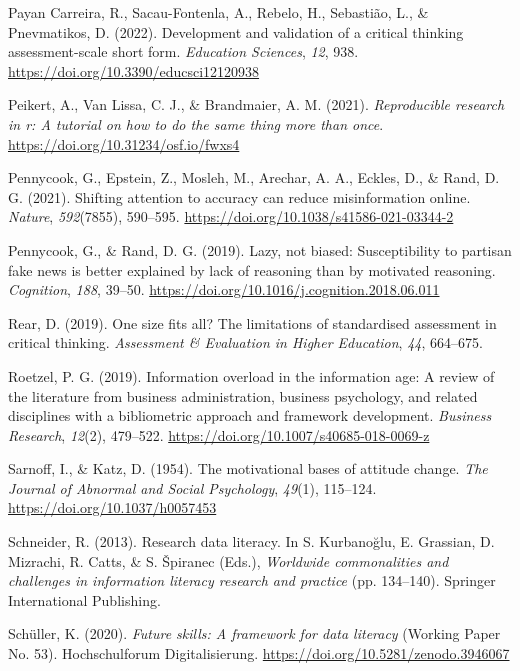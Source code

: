 \documentclass[
  12pt,
  a4paper,
  twoside]{article}
\newlength{\cslhangindent}
\newenvironment{CSLReferences}[2] %
 {\begin{list}{}{%
  \setlength{\itemindent}{0pt}
  \setlength{\leftmargin}{0pt}
  \setlength{\parsep}{0pt}
  \ifodd #1
   \setlength{\leftmargin}{\cslhangindent}
   \setlength{\itemindent}{-1\cslhangindent}
  \fi
  \setlength{\itemsep}{#2\baselineskip}}}
 {\end{list}}
\begin{document}
\begin{CSLReferences}{1}{0}
Payan Carreira, R., Sacau-Fontenla, A., Rebelo, H., Sebastião, L., \& Pnevmatikos, D. (2022). Development and validation of a critical thinking assessment-scale short form. \emph{Education Sciences}, \emph{12}, 938. \url{https://doi.org/10.3390/educsci12120938}

Peikert, A., Van Lissa, C. J., \& Brandmaier, A. M. (2021). \emph{Reproducible research in r: A tutorial on how to do the same thing more than once}. \url{https://doi.org/10.31234/osf.io/fwxs4}

Pennycook, G., Epstein, Z., Mosleh, M., Arechar, A. A., Eckles, D., \& Rand, D. G. (2021). Shifting attention to accuracy can reduce misinformation online. \emph{Nature}, \emph{592}(7855), 590--595. \url{https://doi.org/10.1038/s41586-021-03344-2}

Pennycook, G., \& Rand, D. G. (2019). Lazy, not biased: Susceptibility to partisan fake news is better explained by lack of reasoning than by motivated reasoning. \emph{Cognition}, \emph{188}, 39--50. \url{https://doi.org/10.1016/j.cognition.2018.06.011}

Rear, D. (2019). One size fits all? The limitations of standardised assessment in critical thinking. \emph{Assessment \& Evaluation in Higher Education}, \emph{44}, 664--675.

Roetzel, P. G. (2019). Information overload in the information age: A review of the literature from business administration, business psychology, and related disciplines with a bibliometric approach and framework development. \emph{Business Research}, \emph{12}(2), 479--522. \url{https://doi.org/10.1007/s40685-018-0069-z}

Sarnoff, I., \& Katz, D. (1954). The motivational bases of attitude change. \emph{The Journal of Abnormal and Social Psychology}, \emph{49}(1), 115--124. \url{https://doi.org/10.1037/h0057453}

Schneider, R. (2013). Research data literacy. In S. Kurbanoğlu, E. Grassian, D. Mizrachi, R. Catts, \& S. Špiranec (Eds.), \emph{Worldwide commonalities and challenges in information literacy research and practice} (pp. 134--140). Springer International Publishing.

Schüller, K. (2020). \emph{Future skills: A framework for data literacy} (Working Paper No. 53). Hochschulforum Digitalisierung. \url{https://doi.org/10.5281/zenodo.3946067}


\end{CSLReferences}
\end{document}
